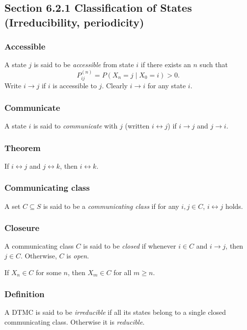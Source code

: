 \documentclass[12pt]{article}
\begin{document}
\subsection*{Section 6.2.1 Classification of States (Irreducibility, periodicity)}

\subsubsection*{Accessible} A state \(j\) is said to be \emph{accessible} from state \(i\) if there exists an \(n\) such that
\[
P_{ij}^{(n)} = P(X_{n} = j \mid X_{0} = i) > 0.
\]
Write \(i \to j\) if \(i\) is accessible to \(j\). Clearly \(i \to i\) for any state \(i\).

\subsubsection*{Communicate} A state \(i\) is said to \emph{communicate} with \(j\) (written \(i \leftrightarrow j\)) if \(i \to j\) and \(j \to i\).

\subsubsection*{Theorem} If \(i \leftrightarrow j\) and \(j \leftrightarrow k\), then \(i \leftrightarrow k\).

\subsubsection*{Communicating class} A set \(C \subseteq S\) is said to be a \emph{communicating class} if for any \(i, j \in C\), \(i \leftrightarrow j\) holds.

\subsubsection*{Closeure} A communicating class \(C\) is said to be \emph{closed} if whenever \(i \in C\) and \(i \to j\), then \(j \in C\). Otherwise, \(C\) is \emph{open}.

If \(X_n \in C\) for some \(n\), then \(X_m \in C\) for all \(m \ge n\).

\subsubsection*{Definition} A DTMC is said to be \emph{irreducible} if all its states belong to a single closed communicating class. Otherwise it is \emph{reducible}.
\newpage
\end{document}
